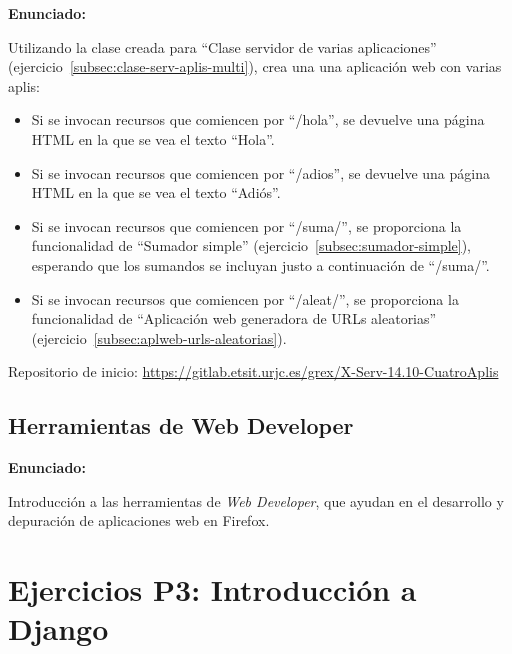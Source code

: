 \textbf{Enunciado:}

Utilizando la clase creada para ``Clase servidor de varias aplicaciones'' (ejercicio~\ref{subsec:clase-serv-aplis-multi}), crea una una aplicación web con varias aplis:

\begin{itemize}
\item Si se invocan recursos que comiencen por ``/hola'', se devuelve una página HTML en la que se vea el texto ``Hola''.
\item Si se invocan recursos que comiencen por ``/adios'', se devuelve una página HTML en la que se vea el texto ``Adiós''.
\item Si se invocan recursos que comiencen por ``/suma/'', se proporciona la funcionalidad de ``Sumador simple'' (ejercicio~\ref{subsec:sumador-simple}), esperando que los sumandos se incluyan justo a continuación de ``/suma/''.
\item Si se invocan recursos que comiencen por ``/aleat/'', se proporciona la funcionalidad de ``Aplicación web generadora de URLs aleatorias'' (ejercicio~\ref{subsec:aplweb-urls-aleatorias}).
\end{itemize}

Repositorio de inicio: \url{https://gitlab.etsit.urjc.es/grex/X-Serv-14.10-CuatroAplis}

\subsection{Herramientas de Web Developer}
\label{subsec:inst-web-developer}

\textbf{Enunciado:}

Introducción a las herramientas de \emph{Web Developer}, que ayudan en el desarrollo
y depuración de aplicaciones web en Firefox.

\section{Ejercicios P3: Introducción a Django}

